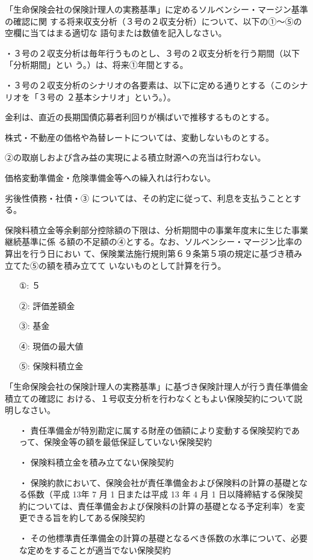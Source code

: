 \documentclass[report,gutter=10mm,fore-edge=10mm,uplatex,dvipdfmx]{jlreq}
\begin{document}

「生命保険会社の保険計理人の実務基準」に定めるソルベンシー・マージン基準の確認に関
する将来収支分析（３号の２収支分析）について、以下の①～⑤の空欄に当てはまる適切な
語句または数値を記入しなさい。

・３号の２収支分析は毎年行うものとし、３号の２収支分析を行う期間（以下「分析期間」とい
う。）は、将来①年間とする。

・３号の２収支分析のシナリオの各要素は、以下に定める通りとする（このシナリオを「３号の
２基本シナリオ」という。）。

 金利は、直近の長期国債応募者利回りが横ばいで推移するものとする。

 株式・不動産の価格や為替レートについては、変動しないものとする。

②の取崩しおよび含み益の実現による積立財源への充当は行わない。

 価格変動準備金・危険準備金等への繰入れは行わない。

 劣後性債務・社債・③
については、その約定に従って、利息を支払うこととする。

保険料積立金等余剰部分控除額の下限は、分析期間中の事業年度末に生じた事業継続基準に係
る額の不足額の④とする。なお、ソルベンシー・マージン比率の算出を行う日におい
て、保険業法施行規則第６９条第５項の規定に基づき積み立てた⑤の額を積み立てて
いないものとして計算を行う。

\answer{}
\begin{itemize}
 \item[①: ]  ５ 
 \item[②: ]  評価差額金 
 \item[③: ]  基金 
 \item[④: ]  現価の最大値 
 \item[⑤: ]  保険料積立金 
\end{itemize}

「生命保険会社の保険計理人の実務基準」に基づき保険計理人が行う責任準備金積立ての確認に
おける、１号収支分析を行わなくともよい保険契約について説明しなさい。
\answer{}
\begin{itemize}
\item[ ・] 責任準備金が特別勘定に属する財産の価額により変動する保険契約であって、保険金等の額を最低保証していない保険契約
\item[ ・] 保険料積立金を積み立てない保険契約
\item[ ・] 保険約款において、保険会社が責任準備金および保険料の計算の基礎となる係数（平成 13年 7 月 1 日または平成 13 年 4 月 1 日以降締結する保険契約については、責任準備金および保険料の計算の基礎となる予定利率）を変更できる旨を約してある保険契約
\item[ ・] その他標準責任準備金の計算の基礎となるべき係数の水準について、必要な定めをすることが適当でない保険契約
\end{itemize}
\end{document}
